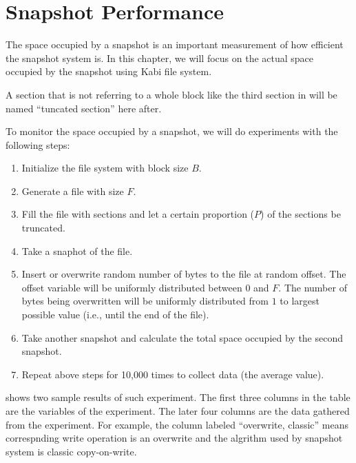 \chapter{Snapshot Performance}
\label{chap:perform}

    The space occupied by a snapshot is an important measurement of how efficient the snapshot system is. In this chapter, we will focus on the actual space occupied by the snapshot using Kabi file system.
    
    A section that is not referring to a whole block like the third section in  will be named ``tuncated section'' here after.

    To monitor the space occupied by a snapshot, we will do experiments with the following steps:

\begin{enumerate}
	\item Initialize the file system with block size $B$.

	\item Generate a file with size $F$.

	\item Fill the file with sections and let a certain proportion ($P$) of the sections be truncated.

	\item Take a snaphot of the file.
	
	\item Insert or overwrite random number of bytes to the file at random offset. The offset variable will be uniformly distributed between $0$ and $F$. The number of bytes being overwritten will be uniformly distributed from $1$ to largest possible value (i.e., until the end of the file).

	\item Take another snapshot and calculate the total space occupied by the second snapshot.

	\item Repeat above steps for 10,000 times to collect data (the average value).
\end{enumerate}

     shows two sample results of such experiment. The first three columns in the table are the variables of the experiment. The later four columns are the data gathered from the experiment. For example, the column labeled ``overwrite, classic'' means correspnding write operation is an overwrite and the algrithm used by snapshot system is classic copy-on-write.

